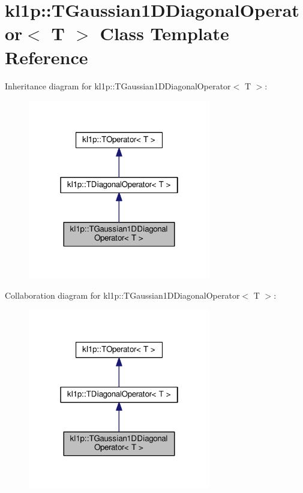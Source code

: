 \hypertarget{classkl1p_1_1TGaussian1DDiagonalOperator}{}\section{kl1p\+:\+:T\+Gaussian1\+D\+Diagonal\+Operator$<$ T $>$ Class Template Reference}
\label{classkl1p_1_1TGaussian1DDiagonalOperator}


Inheritance diagram for kl1p\+:\+:T\+Gaussian1\+D\+Diagonal\+Operator$<$ T $>$\+:
\nopagebreak
\begin{figure}[H]
\begin{center}
\leavevmode
\includegraphics[width=226pt]{classkl1p_1_1TGaussian1DDiagonalOperator__inherit__graph}
\end{center}
\end{figure}


Collaboration diagram for kl1p\+:\+:T\+Gaussian1\+D\+Diagonal\+Operator$<$ T $>$\+:
\nopagebreak
\begin{figure}[H]
\begin{center}
\leavevmode
\includegraphics[width=226pt]{classkl1p_1_1TGaussian1DDiagonalOperator__coll__graph}
\end{center}
\end{figure}
